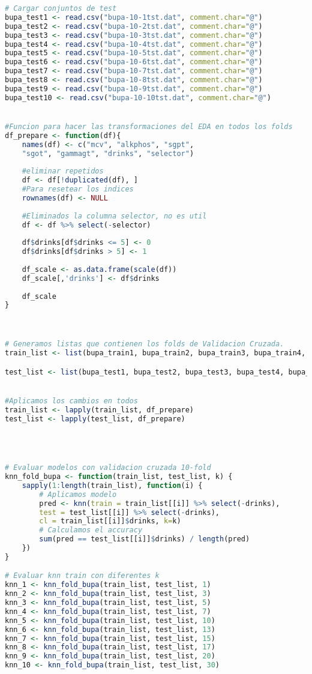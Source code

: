 \begin{lstlisting}[language=R]
# Cargar conjuntos de test
bupa_test1 <- read.csv("bupa-10-1tst.dat", comment.char="@")
bupa_test2 <- read.csv("bupa-10-2tst.dat", comment.char="@")
bupa_test3 <- read.csv("bupa-10-3tst.dat", comment.char="@")
bupa_test4 <- read.csv("bupa-10-4tst.dat", comment.char="@")
bupa_test5 <- read.csv("bupa-10-5tst.dat", comment.char="@")
bupa_test6 <- read.csv("bupa-10-6tst.dat", comment.char="@")
bupa_test7 <- read.csv("bupa-10-7tst.dat", comment.char="@")
bupa_test8 <- read.csv("bupa-10-8tst.dat", comment.char="@")
bupa_test9 <- read.csv("bupa-10-9tst.dat", comment.char="@")
bupa_test10 <- read.csv("bupa-10-10tst.dat", comment.char="@")


#Funcion para hacer las transformaciones del EDA en todos los folds
df_prepare <- function(df){
	names(df) <- c("mcv", "alkphos", "sgpt",
	"sgot", "gammagt", "drinks", "selector")
	
	#eliminar repetidos
	df <- df[!duplicated(df), ]
	#Para resetear los indices
	rownames(df) <- NULL
	
	#Eliminados la columna selector, no es util
	df <- df %>% select(-selector)
	
	df$drinks[df$drinks <= 5] <- 0
	df$drinks[df$drinks > 5] <- 1
	
	df_scale <- as.data.frame(scale(df))
	df_scale[,'drinks'] <- df$drinks
	
	df_scale
}



# Generamos listas que contienen los folds de Validacion Cruzada.
train_list <- list(bupa_train1, bupa_train2, bupa_train3, bupa_train4, bupa_train5, bupa_train6, bupa_train7, bupa_train8, bupa_train9, bupa_train10)

test_list <- list(bupa_test1, bupa_test2, bupa_test3, bupa_test4, bupa_test5, bupa_test6, bupa_test7, bupa_test8, bupa_test9, bupa_test10)


#Aplicamos los cambios en todos
train_list <- lapply(train_list, df_prepare)
test_list <- lapply(test_list, df_prepare)




# Evaluar modelos con validacion cruzada 10-fold
knn_fold_bupa <- function(train_list, test_list, k) {
	sapply(1:length(train_list), function(i) {
		# Aplicamos modelo
		pred <- knn(train = train_list[[i]] %>% select(-drinks), 
		test = test_list[[i]] %>% select(-drinks), 
		cl = train_list[[i]]$drinks, k=k)
		# Calculamos el accuracy
		sum(pred == test_list[[i]]$drinks) / length(pred)
	})
}

# Evaluar knn train con diferentes k
knn_1 <- knn_fold_bupa(train_list, test_list, 1)
knn_2 <- knn_fold_bupa(train_list, test_list, 3)
knn_3 <- knn_fold_bupa(train_list, test_list, 5)
knn_4 <- knn_fold_bupa(train_list, test_list, 7)
knn_5 <- knn_fold_bupa(train_list, test_list, 10)
knn_6 <- knn_fold_bupa(train_list, test_list, 13)
knn_7 <- knn_fold_bupa(train_list, test_list, 15)
knn_8 <- knn_fold_bupa(train_list, test_list, 17)
knn_9 <- knn_fold_bupa(train_list, test_list, 20)
knn_10 <- knn_fold_bupa(train_list, test_list, 30)


\end{lstlisting}
